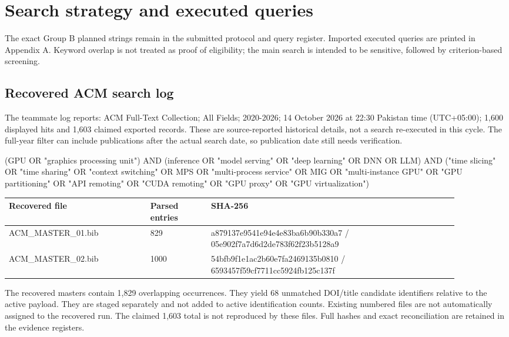 \documentclass[12pt,a4paper]{article}
\begin{document}
\section{Search strategy and executed queries}
The exact Group B planned strings remain in the submitted protocol and query register. Imported executed queries are printed in Appendix A. Keyword overlap is not treated as proof of eligibility; the main search is intended to be sensitive, followed by criterion-based screening.


\subsection{Recovered ACM search log}
The teammate log reports: ACM Full-Text Collection; All Fields; 2020-2026; 14 October 2026 at 22:30 Pakistan time (UTC+05:00); 1,600 displayed hits and 1,603 claimed exported records. These are source-reported historical details, not a search re-executed in this cycle. The full-year filter can include publications after the actual search date, so publication date still needs verification.


{\small\ttfamily\raggedright (GPU OR "graphics processing unit") AND (inference OR "model serving" OR "deep learning" OR DNN OR LLM) AND ("time slicing" OR "time sharing" OR "context switching" OR MPS OR "multi-process service" OR MIG OR "multi-instance GPU" OR "GPU partitioning" OR "API remoting" OR "CUDA remoting" OR "GPU proxy" OR "GPU virtualization")\par}
\begin{longtable}{p{0.28\linewidth}p{0.12\linewidth}p{0.49\linewidth}}
\toprule
Recovered file & Parsed entries & SHA-256\\\midrule
\endhead
ACM\_MASTER\_01.bib & 829 & a879137e9541e94e4e83ba6b90b330a7 /\allowbreak{} 05e902f7a7d6d2de783f62f23b5128a9\\
ACM\_MASTER\_02.bib & 1000 & 54bfb9f1e1ac2b60e7fa2469135b0810 /\allowbreak{} 6593457f59cf7711cc5924fb125c137f\\
\bottomrule
\end{longtable}

The recovered masters contain 1,829 overlapping occurrences. They yield 68 unmatched DOI/\allowbreak{}title candidate identifiers relative to the active payload. They are staged separately and not added to active identification counts. Existing numbered files are not automatically assigned to the recovered run. The claimed 1,603 total is not reproduced by these files. Full hashes and exact reconciliation are retained in the evidence registers.
\end{document}
